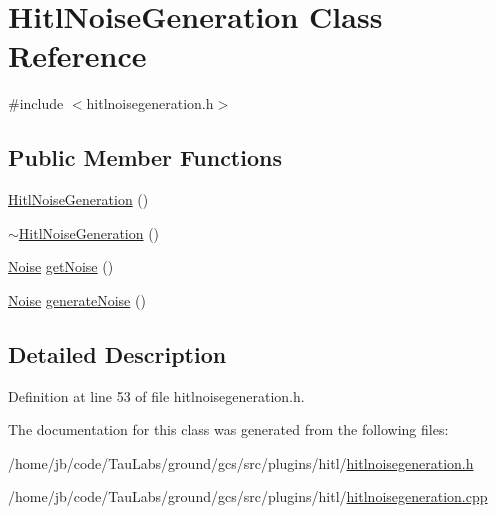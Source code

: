 \hypertarget{class_hitl_noise_generation}{\section{\-Hitl\-Noise\-Generation \-Class \-Reference}
\label{class_hitl_noise_generation}
}


{\ttfamily \#include $<$hitlnoisegeneration.\-h$>$}

\subsection*{\-Public \-Member \-Functions}
\begin{DoxyCompactItemize}
\item 
\hyperlink{group___h_i_t_l_plugin_ga1dab19a6599c296ffb839d1449789da2}{\-Hitl\-Noise\-Generation} ()
\item 
\hyperlink{group___h_i_t_l_plugin_ga86eb1b28193cc2594ee5bd38658eb06a}{$\sim$\-Hitl\-Noise\-Generation} ()
\item 
\hyperlink{struct_noise}{\-Noise} \hyperlink{group___h_i_t_l_plugin_ga48da3a2284408957fb754e0e4488ab16}{get\-Noise} ()
\item 
\hyperlink{struct_noise}{\-Noise} \hyperlink{group___h_i_t_l_plugin_ga1492fee962eb0c1d6b48d8a4167d6d67}{generate\-Noise} ()
\end{DoxyCompactItemize}


\subsection{\-Detailed \-Description}


\-Definition at line 53 of file hitlnoisegeneration.\-h.



\-The documentation for this class was generated from the following files\-:\begin{DoxyCompactItemize}
\item 
/home/jb/code/\-Tau\-Labs/ground/gcs/src/plugins/hitl/\hyperlink{hitlnoisegeneration_8h}{hitlnoisegeneration.\-h}\item 
/home/jb/code/\-Tau\-Labs/ground/gcs/src/plugins/hitl/\hyperlink{hitlnoisegeneration_8cpp}{hitlnoisegeneration.\-cpp}\end{DoxyCompactItemize}
